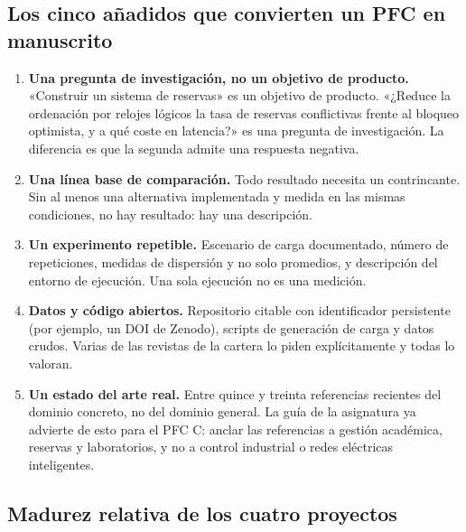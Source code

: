 \documentclass[11pt,a4paper]{article}
\begin{document}
\subsection{Los cinco añadidos que convierten un PFC en manuscrito}

\begin{enumerate}[leftmargin=*,itemsep=5pt]
	\item \textbf{Una pregunta de investigación, no un objetivo de producto.} «Construir un sistema de reservas» es un objetivo de producto. «¿Reduce la ordenación por relojes lógicos la tasa de reservas conflictivas frente al bloqueo optimista, y a qué coste en latencia?» es una pregunta de investigación. La diferencia es que la segunda admite una respuesta negativa.
	\item \textbf{Una línea base de comparación.} Todo resultado necesita un contrincante. Sin al menos una alternativa implementada y medida en las mismas condiciones, no hay resultado: hay una descripción.
	\item \textbf{Un experimento repetible.} Escenario de carga documentado, número de repeticiones, medidas de dispersión y no solo promedios, y descripción del entorno de ejecución. Una sola ejecución no es una medición.
	\item \textbf{Datos y código abiertos.} Repositorio citable con identificador persistente (por ejemplo, un DOI de Zenodo), scripts de generación de carga y datos crudos. Varias de las revistas de la cartera lo piden explícitamente y todas lo valoran.
	\item \textbf{Un estado del arte real.} Entre quince y treinta referencias recientes del dominio concreto, no del dominio general. La guía de la asignatura ya advierte de esto para el PFC C: anclar las referencias a gestión académica, reservas y laboratorios, y no a control industrial o redes eléctricas inteligentes.
\end{enumerate}

\subsection{Madurez relativa de los cuatro proyectos}
\end{document}
